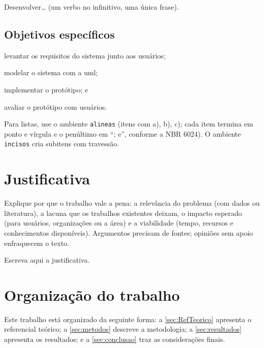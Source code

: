 Desenvolver\ldots{} (um verbo no infinitivo, uma única frase).

\subsection{Objetivos específicos}

\begin{alineas}
  \item levantar os requisitos do sistema junto aos usuários;
  \item modelar o sistema com a \ac{uml};
  \item implementar o protótipo; e
  \item avaliar o protótipo com usuários.
\end{alineas}

\begin{dica}
Para listas, use o ambiente \texttt{alineas} (itens com a), b), c); cada item termina
em ponto e vírgula e o penúltimo em ``; e'', conforme a NBR 6024). O ambiente
\texttt{incisos} cria subitens com travessão.
\end{dica}

\section{Justificativa}\label{sec:justificativa}

\begin{dica}
Explique por que o trabalho vale a pena: a relevância do problema (com dados ou
literatura), a lacuna que os trabalhos existentes deixam, o impacto esperado (para
usuários, organizações ou a área) e a viabilidade (tempo, recursos e conhecimentos
disponíveis). Argumentos precisam de fontes; opiniões sem apoio enfraquecem o texto.
\end{dica}

Escreva aqui a justificativa.

\section{Organização do trabalho}\label{sec:organizacao}

Este trabalho está organizado da seguinte forma: a \autoref{sec:RefTeorico}
apresenta o referencial teórico; a \autoref{sec:metodos} descreve a metodologia; a
\autoref{sec:resultados} apresenta os resultados; e a \autoref{sec:conclusao} traz
as considerações finais.
